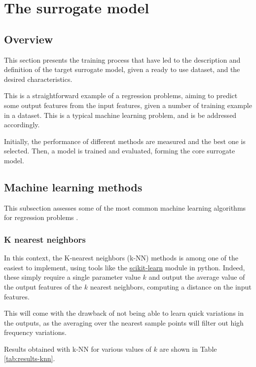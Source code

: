 \section{The surrogate model}

\subsection{Overview}

This section presents the training process that have led to the description and definition of the target surrogate model, given a ready to use dataset, and the desired characteristics.

This is a straightforward example of a regression problems, aiming to predict some output features from the input features, given a number of training example in a dataset. This is a typical machine learning problem, and is be addressed accordingly.

Initially, the performance of different methods are measured and the best one is selected. Then, a model is trained and evaluated, forming the core surrogate model.

\subsection{Machine learning methods}

This subsection assesses some of the most common machine learning algorithms for regression problems \cite{machine-learning-class}.

\subsubsection{K nearest neighbors}

In this context, the K-nearest neighbors (k-NN) methods is among one of the easiest to implement, using tools like the \href{https://scikit-learn.org/stable/modules/neighbors.html\#nearest-neighbors-regression}{scikit-learn} \cite{scikit-learn} module in python. Indeed, these simply require a single parameter value $k$ and output the average value of the output features of the $k$ nearest neighbors, computing a distance on the input features.

This will come with the drawback of not being able to learn quick variations in the outputs, as the averaging over the nearest sample points will filter out high frequency variations.

Results obtained with k-NN for various values of $k$ are shown in Table \ref{tab:results-knn}.

